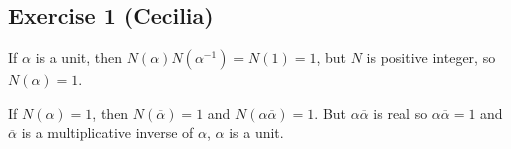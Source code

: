 \subsection*{Exercise 1 (Cecilia)}
If $ \alpha $ is a unit, then $ N(\alpha) N(\alpha^{-1}) = N(1) = 1 $, but $ N $ is positive integer, so $ N(\alpha) = 1 $.

If $ N(\alpha) = 1 $, then $ N(\overline{\alpha}) = 1 $ and $ N(\alpha \overline{\alpha}) = 1 $. But $ \alpha \overline{\alpha}$ is real so $ \alpha \overline{\alpha} = 1 $ and $ \overline{\alpha} $ is a multiplicative inverse of $ \alpha $, $ \alpha $ is a unit.